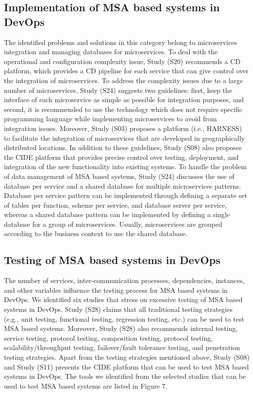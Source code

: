 \subsection{Implementation of MSA based systems in DevOps}

The identified problems and solutions in this category belong to microservices integration and managing databases for microservices. To deal with the operational and configuration complexity issue, Study (S20) recommends a CD platform, which provides a CD pipeline for each service that can give control over the integration of microservices. To address the complexity issues due to a large number of microservices, Study (S24) suggests two guidelines: first, keep the interface of each microservice as simple as possible for integration purposes, and second, it is recommended to use the technology which does not require specific programming language while implementing microservices to avoid from integration issues. Moreover, Study (S03) proposes a platform (i.e., HARNESS) to facilitate the integration of microservices that are developed in geographically distributed locations. In addition to these guidelines, Study (S08) also proposes the CIDE platform that provides precise control over testing, deployment, and integration of the new functionality into existing systems. To handle the problem of data management of MSA based systems, Study (S24) discusses the use of database per service and a shared database for multiple microservices patterns. Database per service pattern can be implemented through defining a separate set of tables per function, scheme per service, and database server per service, whereas a shared database pattern can be implemented by defining a single database for a group of microservices. Usually, microservices are grouped according to the business context to use the shared database.

\subsection{Testing of MSA based systems in DevOps}
The number of services, inter-communication processes, dependencies, instances, and other variables influence the testing process for MSA based systems in DevOps. We identified six studies that stress on excessive testing of MSA based systems in DevOps. Study (S28) claims that all traditional testing strategies (e.g., unit testing, functional testing, regression testing, etc.) can be used to test MSA based systems. Moreover, Study (S28) also recommends internal testing, service testing, protocol testing, composition testing, protocol testing, scalability/throughput testing, failover/fault tolerance testing, and penetration testing strategies. Apart from the testing strategies mentioned above, Study (S08) and Study (S11) presents the CIDE platform that can be used to test MSA based systems in DevOps. The tools we identified from the selected studies that can be used to test MSA based systems are listed in Figure 7.


